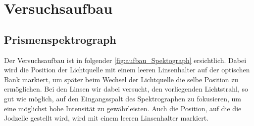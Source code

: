 \documentclass[12pt,english,ngerman]{scrartcl}
\begin{document}
\section{Versuchsaufbau}\label{sec:aufbau}

\subsection{Prismenspektrograph}

Der Versuchsaufbau ist in folgender \autoref{fig:aufbau_Spektograph}
ersichtlich. Dabei wird die Position der Lichtquelle mit einem leeren
Linsenhalter auf der optischen Bank markiert, um später beim Wechsel der
Lichtquelle die selbe Position zu ermöglichen. Bei den Linsen wir dabei
versucht, den vorliegenden Lichtstrahl, so gut wie möglich, auf den
Eingangsspalt des Spektrographen zu fokusieren, um eine möglichst hohe
Intensität zu gewährleisten. Auch die Position, auf die die Jodzelle gestellt
wird, wird mit einem leeren Linsenhalter markiert.
\end{document}
